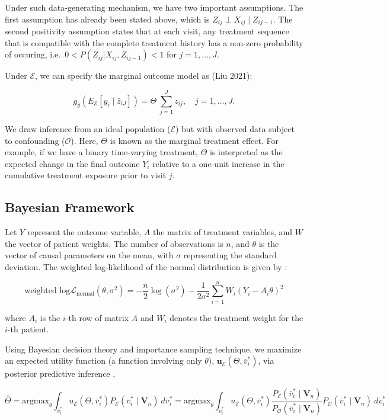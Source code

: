 Under such data-generating mechanism, we have two important assumptions.
The first assumption has already been stated above, which is
\(Z_{ij} \perp X_{ij} \mid Z_{ij-1}\). The second positivity assumption
states that at each visit, any treatment sequence that is compatible
with the complete treatment history has a non-zero probability of
occuring, i.e.~\(0 < P(Z_{ij} | X_{ij}, Z_{ij-1}) < 1\) for
\(j = 1, \ldots, J\).

Under \(\mathcal{E}\), we can specify the marginal outcome model as
(Liu 2021):

\[
   g_y( E_{\mathcal{E}}[{y}_{i} \mid \bar{z}_{iJ}]) = {\Theta} \
   \sum_{j=1}^J z_{ij}, \quad j=1,\ldots,J.
\]

We draw inference from an ideal population (\(\mathcal{E}\)) but with
observed data subject to confounding (\(\mathcal{O}\)). Here, \({\Theta}\)
is known as the marginal treatment effect. For example, if we have a
binary time-varying treatment, \({\Theta}\) is interpreted as the expected change in the final outcome \(Y_i\) relative to a one-unit increase in the cumulative treatment exposure prior to visit \(j\).

\subsection{Bayesian Framework}\label{bayesian-framework}

Let \(Y\) represent the outcome variable, \(A\) the matrix of treatment
variables, and \(W\) the vector of patient weights. The number of
observations is \(n\), and \(\theta\) is the vector of causal parameters on
the mean, with \(\sigma\) representing the standard deviation. The
weighted log-likelihood of the normal distribution is given by
\cite{shaliziLecture}:

\[
\text{weighted log}\mathcal{L}_{\text{normal}}(\theta, \sigma^2) = -\frac{n}{2} \log(\sigma^2) - \frac{1}{2\sigma^2} \sum_{i=1}^{n} W_i (Y_i - A_i \theta)^2
\]

where \(A_i\) is the \(i\)-th row of matrix \(A\) and \(W_i\) denotes the
treatment weight for the \(i\)-th patient.

Using Bayesian decision theory and importance sampling technique, we
maximize an expected utility function (a function involving only
\(\theta\)), \(\textbf{u}_{\mathcal{E}}(\Theta, \bar{v}_{i}^*)\), via
posterior predictive inference \cite{liuBayesianCausal},

\[
\hat{\Theta} 
 = \text{argmax}_{\theta} \int_{\bar{v}_{i}^*}  u_{\mathcal{E}}(\Theta, \bar{v}_{i}^*)P_{\mathcal{E}}(\bar{v}_{i}^* \mid \textbf{V}_n) \ d\bar{v}_{i}^* 
= \text{argmax}_{\theta}\int_{\bar{v}_{i}^*}  u_{\mathcal{E}}(\Theta, \bar{v}_{i}^*) \frac{P_{\mathcal{E}}(\bar{v}_{i}^* \mid \textbf{V}_n) }{P_{\mathcal{O}}(\bar{v}_{i}^* \mid \textbf{V}_n)}P_{\mathcal{O}}(\bar{v}_{i}^* \mid \textbf{V}_n) \ d\bar{v}_{i}^* 
\]

